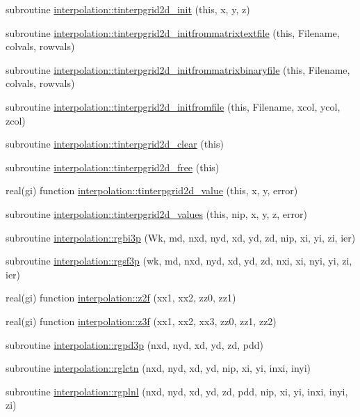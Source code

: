 \begin{DoxyCompactItemize}
\item 
subroutine \mbox{\hyperlink{namespaceinterpolation_af4593e1e65b9137fa491cdaf9d0682a8}{interpolation\+::tinterpgrid2d\+\_\+init}} (this, x, y, z)
\item 
subroutine \mbox{\hyperlink{namespaceinterpolation_aba9a8e8e9bf241c6a561b243f3e92620}{interpolation\+::tinterpgrid2d\+\_\+initfrommatrixtextfile}} (this, Filename, colvals, rowvals)
\item 
subroutine \mbox{\hyperlink{namespaceinterpolation_a3420758fce41c1a63122fd3d35b973eb}{interpolation\+::tinterpgrid2d\+\_\+initfrommatrixbinaryfile}} (this, Filename, colvals, rowvals)
\item 
subroutine \mbox{\hyperlink{namespaceinterpolation_aad92c485265e298041ddb85fdc576ca1}{interpolation\+::tinterpgrid2d\+\_\+initfromfile}} (this, Filename, xcol, ycol, zcol)
\item 
subroutine \mbox{\hyperlink{namespaceinterpolation_a830b760c24924ee524054ca9f712d972}{interpolation\+::tinterpgrid2d\+\_\+clear}} (this)
\item 
subroutine \mbox{\hyperlink{namespaceinterpolation_a05968790c56ace3a6aff6f9b81d35b0c}{interpolation\+::tinterpgrid2d\+\_\+free}} (this)
\item 
real(gi) function \mbox{\hyperlink{namespaceinterpolation_a77feb149313f842af954a528b8bff58e}{interpolation\+::tinterpgrid2d\+\_\+value}} (this, x, y, error)
\item 
subroutine \mbox{\hyperlink{namespaceinterpolation_ad36dce10ba7587405b8862f7bea68d33}{interpolation\+::tinterpgrid2d\+\_\+values}} (this, nip, x, y, z, error)
\item 
subroutine \mbox{\hyperlink{namespaceinterpolation_a44b1a5e85b19c58f04e2f7e3483cbb3f}{interpolation\+::rgbi3p}} (Wk, md, nxd, nyd, xd, yd, zd, nip, xi, yi, zi, ier)
\item 
subroutine \mbox{\hyperlink{namespaceinterpolation_a1e2786e4f0a0a9dd065f757b66de84fd}{interpolation\+::rgsf3p}} (wk, md, nxd, nyd, xd, yd, zd, nxi, xi, nyi, yi, zi, ier)
\item 
real(gi) function \mbox{\hyperlink{namespaceinterpolation_a1046109eeab848ab2641b54b30004885}{interpolation\+::z2f}} (xx1, xx2, zz0, zz1)
\item 
real(gi) function \mbox{\hyperlink{namespaceinterpolation_aa80e5ef1a8e693b3c094f26f166cebf2}{interpolation\+::z3f}} (xx1, xx2, xx3, zz0, zz1, zz2)
\item 
subroutine \mbox{\hyperlink{namespaceinterpolation_a20aedcecd7b269f068dfe4fcce012458}{interpolation\+::rgpd3p}} (nxd, nyd, xd, yd, zd, pdd)
\item 
subroutine \mbox{\hyperlink{namespaceinterpolation_a2ddceaba83710295f2263bfbe4aa6924}{interpolation\+::rglctn}} (nxd, nyd, xd, yd, nip, xi, yi, inxi, inyi)
\item 
subroutine \mbox{\hyperlink{namespaceinterpolation_ab2d80355a943b73b1de2cef700693500}{interpolation\+::rgplnl}} (nxd, nyd, xd, yd, zd, pdd, nip, xi, yi, inxi, inyi, zi)
\end{DoxyCompactItemize}
